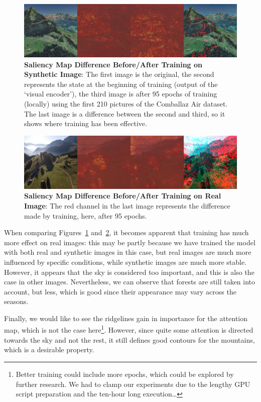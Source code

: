 \documentclass[10pt,conference,compsocconf]{IEEEtran}
\begin{document}
\begin{figure}[hbpt]
\scriptsize
\includegraphics[width=\linewidth]{images/topo_loop_attention_atloc_11.png}
\caption{\textbf{Saliency Map Difference Before/After Training on Synthetic Image}: The first image is the original, the second represents the state at the beginning of training (output of the `visual encoder'), the third image is after 95 epochs of training (locally) using the first 210 pictures of the Comballaz Air dataset. The last image is a difference between the second and third, so it shows where training has been effective.}
\label{fig:saliency-synthetic}
\end{figure}

\begin{figure}[hbpt]
\scriptsize
\includegraphics[width=\linewidth]{images/comballaz_air_attention_AtLoc_19.png}
\caption{\textbf{Saliency Map Difference Before/After Training on Real Image}: The red channel in the last image represents the difference made by training, here, after 95 epochs.}
\label{fig:saliency-real}
\end{figure}


When comparing Figures~\ref{fig:saliency-synthetic} and~\ref{fig:saliency-real}, it becomes apparent that training has much more effect on real images: this may be partly because we have trained the model with both real and synthetic images in this case, but real images are much more influenced by specific conditions, while synthetic images are much more stable. However, it appears that the sky is considered too important, and this is also the case in other images. Nevertheless, we can observe that forests are still taken into account, but less, which is good since their appearance may vary across the seasons.

Finally, we would like to see the ridgelines gain in importance for the attention map, which is not the case here\footnote{Better training could include more epochs, which could be explored by further research. We had to clamp our experiments due to the lengthy GPU script preparation and the ten-hour long execution\ldots}. However, since quite some attention is directed towards the sky and not the rest, it still defines good contours for the mountains, which is a desirable property. %
\end{document}
